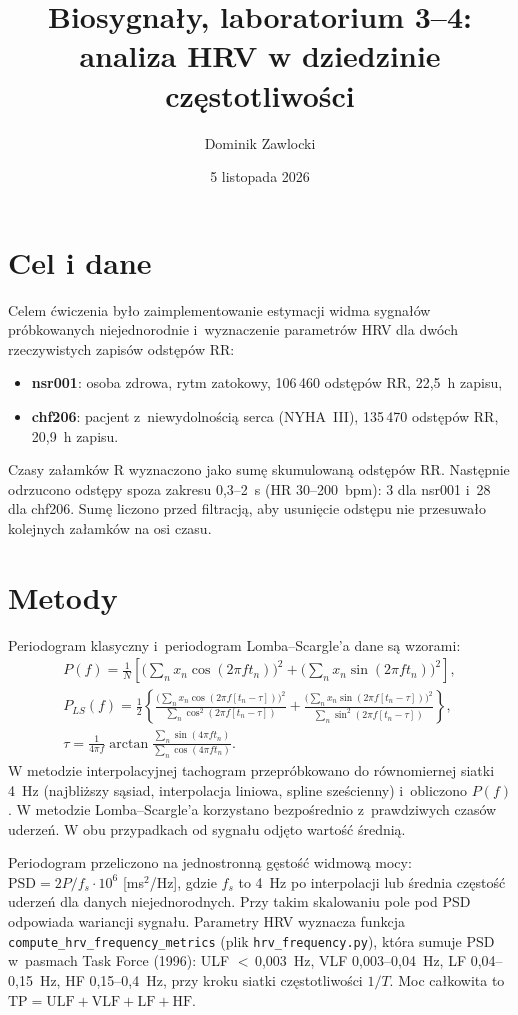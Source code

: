 \documentclass[11pt,a4paper]{article}
\title{Biosygnały, laboratorium 3--4:\\analiza HRV w dziedzinie częstotliwości}
\author{Dominik Zawlocki}
\date{5 listopada 2026}
\begin{document}
\maketitle

\section{Cel i dane}
Celem ćwiczenia było zaimplementowanie estymacji widma sygnałów próbkowanych niejednorodnie i~wyznaczenie parametrów HRV dla dwóch rzeczywistych zapisów odstępów RR:
\begin{itemize}
  \item \textbf{nsr001}: osoba zdrowa, rytm zatokowy, 106\,460 odstępów RR, 22,5~h zapisu,
  \item \textbf{chf206}: pacjent z~niewydolnością serca (NYHA~III), 135\,470 odstępów RR, 20,9~h zapisu.
\end{itemize}
Czasy załamków R wyznaczono jako sumę skumulowaną odstępów RR. Następnie odrzucono odstępy spoza zakresu 0,3--2~s (HR 30--200~bpm): 3 dla nsr001 i~28 dla chf206. Sumę liczono przed filtracją, aby usunięcie odstępu nie przesuwało kolejnych załamków na osi czasu.

\section{Metody}
Periodogram klasyczny i~periodogram Lomba--Scargle'a dane są wzorami:
\begin{gather}
P(f) = \frac{1}{N}\left[\Big(\sum_n x_n \cos(2\pi f t_n)\Big)^2 + \Big(\sum_n x_n \sin(2\pi f t_n)\Big)^2\right], \\
P_{LS}(f) = \frac{1}{2}\left\{\frac{\big(\sum_n x_n \cos(2\pi f [t_n-\tau])\big)^2}{\sum_n \cos^2(2\pi f [t_n-\tau])} + \frac{\big(\sum_n x_n \sin(2\pi f [t_n-\tau])\big)^2}{\sum_n \sin^2(2\pi f [t_n-\tau])}\right\}, \\
\tau = \frac{1}{4\pi f}\arctan\frac{\sum_n \sin(4\pi f t_n)}{\sum_n \cos(4\pi f t_n)}.
\end{gather}
W metodzie interpolacyjnej tachogram przepróbkowano do równomiernej siatki 4~Hz (najbliższy sąsiad, interpolacja liniowa, spline sześcienny) i~obliczono $P(f)$. W metodzie Lomba--Scargle'a korzystano bezpośrednio z~prawdziwych czasów uderzeń. W obu przypadkach od sygnału odjęto wartość średnią.

Periodogram przeliczono na jednostronną gęstość widmową mocy: $\mathrm{PSD} = 2P/f_s \cdot 10^6$ [ms$^2$/Hz], gdzie $f_s$ to 4~Hz po interpolacji lub średnia częstość uderzeń dla danych niejednorodnych. Przy takim skalowaniu pole pod PSD odpowiada wariancji sygnału. Parametry HRV wyznacza funkcja \texttt{compute\_hrv\_frequency\_metrics} (plik \texttt{hrv\_frequency.py}), która sumuje PSD w~pasmach Task Force (1996): ULF ${<}\,$0,003~Hz, VLF 0,003--0,04~Hz, LF 0,04--0,15~Hz, HF 0,15--0,4~Hz, przy kroku siatki częstotliwości $1/T$. Moc całkowita to $\mathrm{TP} = \mathrm{ULF}+\mathrm{VLF}+\mathrm{LF}+\mathrm{HF}$.
\end{document}
